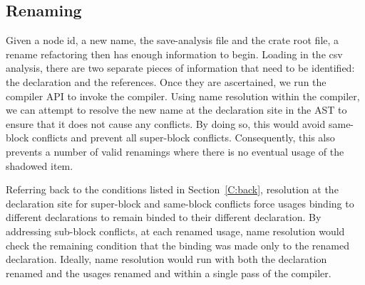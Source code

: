 %

\subsection{Renaming}

Given a node id, a new name, the save-analysis file and the crate root file, a rename refactoring then has enough information to begin. Loading in the csv analysis, there are two separate pieces of information that need to be identified: the declaration and the references. Once they are ascertained, we run the compiler API to invoke the compiler. Using name resolution within the compiler, we can attempt to resolve the new name at the declaration site in the AST to ensure that it does not cause any conflicts. By doing so, this would avoid same-block conflicts and prevent all super-block conflicts. Consequently, this also prevents a number of valid renamings where there is no eventual usage of the shadowed item. %

Referring back to the conditions listed in Section~\ref{C:back}, resolution at the declaration site for super-block and same-block conflicts force usages binding to different declarations to remain binded to their different declaration. By addressing sub-block conflicts, at each renamed usage, name resolution would check the remaining condition that the binding was made only to the renamed declaration. Ideally, name resolution would run with both the declaration renamed and the usages renamed and within a single pass of the compiler.

